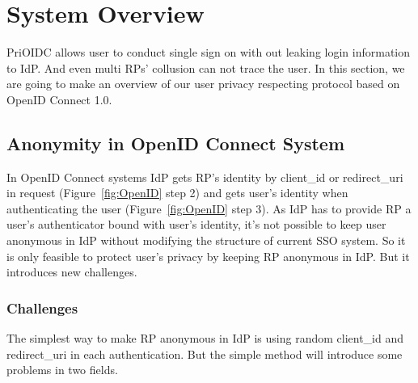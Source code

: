 \section{System Overview}
\label{sec:overview}
PriOIDC allows user to conduct single sign on with out leaking login information to IdP. And even multi RPs' collusion can not trace the user. In this section, we are going to make an overview of our user privacy respecting protocol based on OpenID Connect 1.0.
 
\subsection{Anonymity in OpenID Connect System}
In OpenID Connect systems IdP gets RP's identity by client\_id or redirect\_uri in request (Figure~\ref{fig:OpenID} step 2) and gets user's identity when authenticating the user (Figure~\ref{fig:OpenID} step 3). 
As IdP has to provide RP a user's authenticator bound with user's identity, it's not possible to keep user anonymous in IdP without modifying the structure of current SSO system. 
So it is only feasible to protect user's privacy by keeping RP anonymous in IdP. But it introduces new challenges.

\subsubsection{Challenges}
The simplest way to make RP anonymous in IdP is using random client\_id and redirect\_uri in each authentication. But the simple method will introduce some problems in two fields. 

